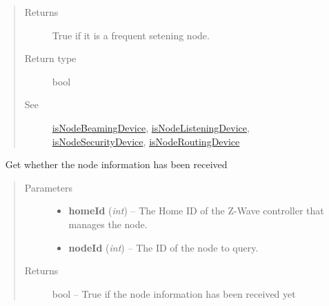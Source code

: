 \documentclass[letterpaper,10pt,english]{sphinxmanual}
\begin{document}
\begin{fulllineitems}
\begin{fulllineitems}
\begin{quote}
\begin{description}
\begin{itemize}
\end{itemize}

\item[{Returns}] \leavevmode
True if it is a frequent setening node.

\item[{Return type}] \leavevmode
bool

\item[{See}] \leavevmode
{\hyperref[libopenzwave:isnodebeamingdevice]{isNodeBeamingDevice}}, {\hyperref[libopenzwave:isnodelisteningdevice]{isNodeListeningDevice}}, {\hyperref[libopenzwave:isnodesecuritydevice]{isNodeSecurityDevice}}, {\hyperref[libopenzwave:isnoderoutingdevice]{isNodeRoutingDevice}}

\end{description}\end{quote}

\end{fulllineitems}


\begin{fulllineitems}
\label{libopenzwave:libopenzwave.PyManager.isNodeInfoReceived}~\label{libopenzwave:isnodeinforeceived}
Get whether the node information has been received
\begin{quote}\begin{description}
\item[{Parameters}] \leavevmode\begin{itemize}
\item {} 
\textbf{homeId} (\emph{int}) -- The Home ID of the Z-Wave controller that manages the node.

\item {} 
\textbf{nodeId} (\emph{int}) -- The ID of the node to query.

\end{itemize}

\item[{Returns}] \leavevmode
bool -- True if the node information has been received yet

\end{description}\end{quote}

\end{fulllineitems}



\end{fulllineitems}
\end{document}
